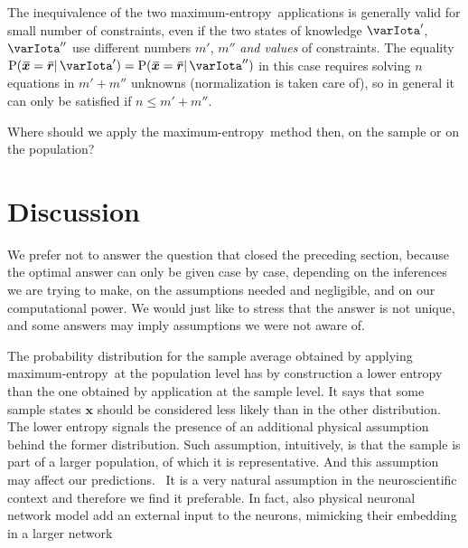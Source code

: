 \documentclass{article}
\theoremstyle{remark}
\theoremstyle{innote}
\renewcommand*{\|}{\mathpunct{|}}%
\renewcommand{\le}{\leqslant}%
\newcommand*{\p}{\mathrm{P}}%
\theoremstyle{simple}
\newcommand*{\puzzle}{{\fontencoding{U}\fontfamily{fontawesometwo}\selectfont\symbol{225}}}
\newcommand{\mynote}[1]{ {\color{notecolour}\puzzle\ #1}}
\newcommand*{\widebar}[1]{{\mkern1.5mu\skew{2}\overline{\mkern-1.5mu#1\mkern-1.5mu}\mkern 1.5mu}}
\newcommand*{\sav}{\widebar} %
\newcommand*{\yxx}{x}%
\newcommand*{\yx}{\bm{\yxx}}%
\newcommand*{\yxs}{\sav{\yx}}%
\newcommand*{\yr}{\bm{r}}%
\newcommand*{\yrs}{\sav{\yr}}%
\newcommand*{\yHa}{\varIota'}
\newcommand*{\yHb}{\varIota''}
\newcommand*{\me}{maximum-entropy}
\begin{document}
The inequivalence of the two \me\ applications is generally valid for small
number of constraints, even if the two states of knowledge $\yHa$, $\yHb$
use different numbers $m'$, $m''$ \emph{and values} of constraints. The
equality $\p(\yxs = \yrs \| \yHa) = \p(\yxs = \yrs \| \yHb)$ in this case
requires solving $n$ equations in $m'+m''$ unknowns (normalization
is taken care of), so in general it can only be satisfied if $n\le m'+m''$.

\medskip

Where should we apply the \me\ method then, on the sample or on the
population?

\section{Discussion}
\label{sec:discussion}

We prefer not to answer the question that closed the preceding section,
because the optimal answer can only be given case by case, depending on the
inferences we are trying to make, on the assumptions needed and negligible,
and on our computational power. We would just like to stress that the
answer is not unique, and some answers may imply assumptions we were not
aware of.

The probability distribution for the sample average obtained by applying
\me\ at the population level has by construction a lower entropy than the
one obtained by application at the sample level. It says that some sample
states $\yx$ should be considered less likely than in the other
distribution. The lower entropy signals the presence of an additional
physical assumption behind the former distribution. Such assumption,
intuitively, is that the sample is part of a larger population, of which it
is representative. And this assumption may affect our predictions.
\mynote{It is a very natural assumption in the neuroscientific context and
  therefore we find it preferable. In fact, also physical neuronal network
  model add an external input to the neurons, mimicking their embedding in a
  larger network}
\end{document}
